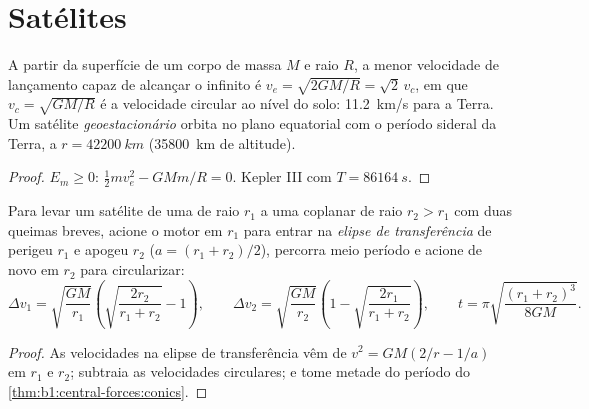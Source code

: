 \section{Satélites}

\begin{proposition}\label{prop:b1:central-forces:escape}
A partir da superfície de um corpo de massa $M$ e raio $R$, a menor
velocidade de lançamento capaz de alcançar o infinito é $v_e = \sqrt{2GM/R} = \sqrt2\,v_c$,
em que $v_c = \sqrt{GM/R}$ é a velocidade circular ao nível do solo:
\qty{11.2}{km/s} para a Terra. Um satélite \emph{geoestacionário} orbita
no plano equatorial com o período sideral da Terra, a
$r = \qty{42200}{km}$ (\qty{35800}{km} de altitude).
\end{proposition}

\begin{proof}
$E_m \geq 0$: $\tfrac12 mv_e^2 - GMm/R = 0$. Kepler III com $T = \qty{86164}{s}$.
\end{proof}

\begin{proposition}\label{prop:b1:central-forces:hohmann}
Para levar um satélite de uma  de raio $r_1$ a uma  coplanar de raio $r_2 > r_1$ com duas queimas breves, acione o motor em $r_1$
para entrar na \emph{elipse de transferência} de perigeu $r_1$ e apogeu $r_2$
($a = (r_1 + r_2)/2$), percorra meio período e acione de novo em $r_2$ para
circularizar:
\[
\Delta v_1 = \sqrt{\frac{GM}{r_1}}\left(\sqrt{\frac{2r_2}{r_1 + r_2}} - 1\right),
\qquad
\Delta v_2 = \sqrt{\frac{GM}{r_2}}\left(1 - \sqrt{\frac{2r_1}{r_1 + r_2}}\right),
\qquad
t = \pi\sqrt{\frac{(r_1 + r_2)^3}{8GM}} .
\]
\end{proposition}

\begin{proof}
As velocidades na elipse de transferência vêm de $v^2 = GM(2/r - 1/a)$ em $r_1$ e
$r_2$; subtraia as velocidades circulares; e tome metade do período do
\cref{thm:b1:central-forces:conics}.
\end{proof}


